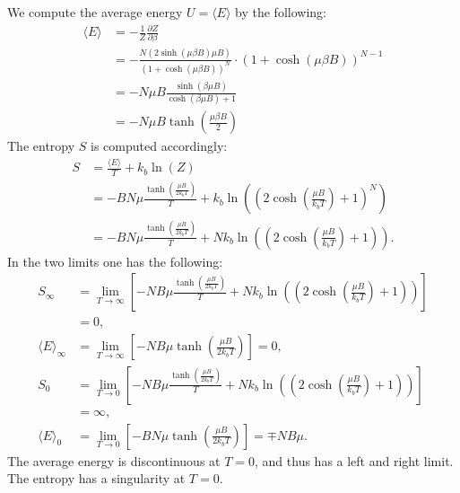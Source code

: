 \documentclass[a4paper]{article}
\newcommand{\average}[1]{\langle #1 \rangle}
\newcommand{\newparagraph}{\vspace{.5cm}\noindent}
\begin{document}
\newparagraph
\begin{comment}
\begin{align*}
    \average{E} &= -\frac{N(2\sinh(\mu\beta B)\mu B)}{(1+\cosh(\mu\beta B))^N}\cdot (1+\cosh(\mu\beta B))^{N-1}\\
    &= -\frac{N2\sinh(\mu\beta B)\mu B}{1+\cosh(\mu\beta B)}\\
    &= -N\mu B \tanh\left(\frac{\mu\beta B}{2}\right)
\end{align*}
\end{comment}
We compute the average energy $U = \average{E}$ by the following:
\begin{align*}
    \average{E} &= -\frac{1}{Z}\frac{\partial Z}{\partial \beta}\\
    &= -\frac{N(2\sinh(\mu\beta B)\mu B)}{(1+\cosh(\mu\beta B))^N}\cdot (1+\cosh(\mu\beta B))^{N-1}\\
    &= -N\mu B\frac{\sinh\left(\beta\mu B\right)}{\cosh(\beta\mu B) + 1}\\
    &= -N\mu B \tanh\left(\frac{\mu\beta B}{2}\right)
\end{align*}
The entropy $S$ is computed accordingly:
\begin{align*}
    S &= \frac{\average{E}}{T} + k_b\ln\left(Z\right)\\
    &= -BN\mu\frac{\tanh\left(\frac{\mu B}{2k_bT}\right)}{T} + k_b\ln\left(\left(2\cosh\left(\frac{\mu B}{k_bT}\right) + 1\right)^N\right)\\
    &= -BN\mu\frac{\tanh\left(\frac{\mu B}{2k_bT}\right)}{T} + Nk_b\ln\left(\left(2\cosh\left(\frac{\mu B}{k_bT}\right) + 1\right)\right).
\end{align*}
In the two limits one has the following:
\begin{align*}
    S_\infty &= \lim_{T\to\infty}\left[ -NB\mu\frac{\tanh\left(\frac{\mu B}{2k_bT}\right)}{T} + Nk_b\ln\left(\left(2\cosh\left(\frac{\mu B}{k_bT}\right) + 1\right)\right)\right]\\
    &=0,\\
    \average{E}_\infty &=\lim_{T\to\infty}\left[-NB\mu\tanh\left(\frac{\mu B}{2k_bT}\right)\right] = 0,\\
    S_0 &= \lim_{T\to0}\left[ -NB\mu\frac{\tanh\left(\frac{\mu B}{2k_bT}\right)}{T} + Nk_b\ln\left(\left(2\cosh\left(\frac{\mu B}{k_bT}\right) + 1\right)\right)\right]\\
    &= \infty,\\
    \average{E}_0 &= \lim_{T\to0}\left[-BN\mu\tanh\left(\frac{\mu B}{2k_bT}\right)\right] = \mp NB\mu.
\end{align*}The average energy is discontinuous at $T=0$, and thus has a left and right limit. The entropy has a singularity at $T=0$.
\end{document}
